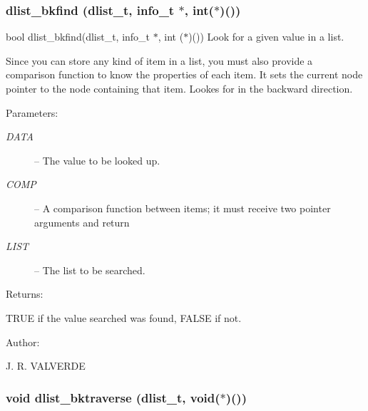 \subsubsection{ dlist\_\-bkfind ({\bf dlist\_\-t}, info\_\-t $\ast$, int($\ast$)())}\label{P__dlist_8h_a18}


bool dlist\_\-bkfind(dlist\_\-t, info\_\-t $\ast$, int ($\ast$)()) Look for a given value in a list.

Since you can store any kind of item in a list, you must also provide a comparison function to know the properties of each item. It sets the current node pointer to the node containing that item. Lookes for in the backward direction.\begin{Desc}
\item[Parameters: ]\par
\begin{description}
\item[{\em 
DATA}]-- The value to be looked up. \item[{\em 
COMP}]-- A comparison function between items; it must receive two pointer arguments and return 
\item[{\em 
LIST}]-- The list to be searched. \end{description}
\end{Desc}
\begin{Desc}
\item[Returns: ]\par
TRUE if the value searched was found, FALSE if not.\end{Desc}
\begin{Desc}
\item[Author: ]\par
J. R. VALVERDE \end{Desc}
\subsubsection{\setlength{\rightskip}{0pt plus 5cm}void dlist\_\-bktraverse ({\bf dlist\_\-t}, void($\ast$)())}\label{P__dlist_8h_a20}


